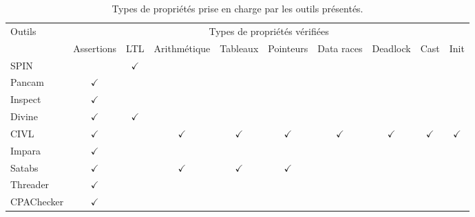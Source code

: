 
\begin{landscape}
\begin{table}[ht]
\centering
\caption{Types de propriétés prise en charge par les outils présentés.}
\begin{tabular}{|l|c|c|c|c|c|c|c|c|c|}
\hline
Outils     & \multicolumn{9}{c|}{Types de propriétés vérifiées}                                                                                     \\
           & Assertions   &      LTL     & Arithmétique &     Tableaux & Pointeurs    & Data races   & Deadlock     & Cast         & Init           \\ \hline
SPIN       &              & $\checkmark$ &              &              &              &              &              &              &                \\
Pancam     & $\checkmark$ &              &              &              &              &              &              &              &                \\
Inspect    & $\checkmark$ &              &              &              &              &              &              &              &                \\
Divine     & $\checkmark$ & $\checkmark$ &              &              &              &              &              &              &                \\
CIVL       & $\checkmark$ &              & $\checkmark$ & $\checkmark$ & $\checkmark$ & $\checkmark$ & $\checkmark$ & $\checkmark$ & $\checkmark$   \\
Impara     & $\checkmark$ &              &              &              &              &              &              &              &                \\
Satabs     & $\checkmark$ &              & $\checkmark$ & $\checkmark$ & $\checkmark$ &              &              &              &                \\
Threader   & $\checkmark$ &              &              &              &              &              &              &              &                \\
CPAChecker & $\checkmark$ &              &              &              &              &              &              &              &                \\

\end{tabular}
\end{table}
\end{landscape}
